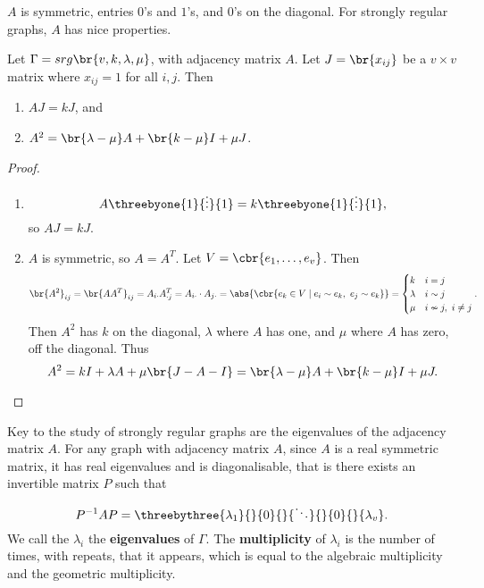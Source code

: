 $ A $ is symmetric, entries $ 0 $'s and $ 1 $'s, and $ 0 $'s on the diagonal. For strongly regular graphs, $ A $ has nice properties.

\begin{proposition}
\label{prop:2.6}
Let $ \Gamma = srg\br{v, k, \lambda, \mu} $, with adjacency matrix $ A $. Let $ J = \br{x_{ij}} $ be a $ v \times v $ matrix where $ x_{ij} = 1 $ for all $ i, j $. Then
\begin{enumerate}
\item $ AJ = kJ $, and
\item $ A^2 = \br{\lambda - \mu}A + \br{k - \mu}I + \mu J $.
\end{enumerate}
\end{proposition}

\begin{proof}
\hfill
\begin{enumerate}
\item
$$ A\threebyone{1}{\vdots}{1} = k\threebyone{1}{\vdots}{1}, $$
so $ AJ = kJ $.
\item $ A $ is symmetric, so $ A = A^T $. Let $ V = \cbr{e_1, \dots, e_v} $. Then
$$ \br{A^2}_{ij} = \br{AA^T}_{ij} = A_{i\cdot}A_{\cdot j}^T = A_{i\cdot} \cdot A_{j\cdot} = \abs{\cbr{e_k \in V \mid e_i \sim e_k, \ e_j \sim e_k}} =
\begin{cases}
k & i = j \\
\lambda & i \sim j \\
\mu & i \nsim j, \ i \ne j
\end{cases}.
$$
Then $ A^2 $ has $ k $ on the diagonal, $ \lambda $ where $ A $ has one, and $ \mu $ where $ A $ has zero, off the diagonal. Thus
$$ A^2 = kI + \lambda A + \mu\br{J - A - I} = \br{\lambda - \mu}A + \br{k - \mu}I + \mu J. $$
\end{enumerate}
\end{proof}

Key to the study of strongly regular graphs are the eigenvalues of the adjacency matrix $ A $. For any graph with adjacency matrix $ A $, since $ A $ is a real symmetric matrix, it has real eigenvalues and is diagonalisable, that is there exists an invertible matrix $ P $ such that
$$ P^{-1}AP = \threebythree{\lambda_1}{}{0}{}{\ddots}{}{0}{}{\lambda_v}. $$
We call the $ \lambda_i $ the \textbf{eigenvalues} of $ \Gamma $. The \textbf{multiplicity} of $ \lambda_i $ is the number of times, with repeats, that it appears, which is equal to the algebraic multiplicity and the geometric multiplicity.

\pagebreak

